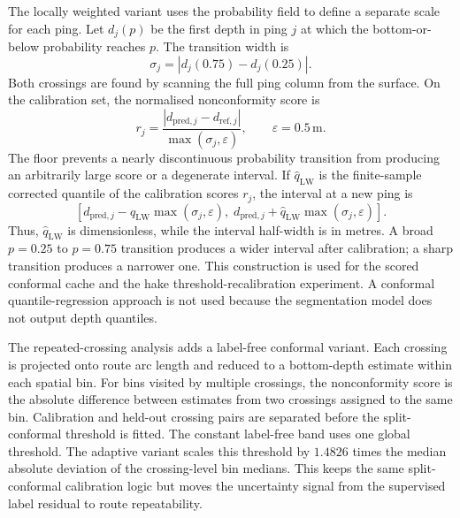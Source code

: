 The locally weighted variant uses the probability field to define a separate scale for each ping. Let $d_j(p)$ be the first depth in ping $j$ at which the bottom-or-below probability reaches $p$. The transition width is
\begin{equation}
    \sigma_j = \left|d_j(0.75)-d_j(0.25)\right|.
\end{equation}
Both crossings are found by scanning the full ping column from the surface. On the calibration set, the normalised nonconformity score is
\begin{equation}
    r_j =
    \frac{\left|d_{\text{pred},j}-d_{\text{ref},j}\right|}
         {\max(\sigma_j,\varepsilon)},
    \qquad \varepsilon=0.5\,\mathrm{m}.
\end{equation}
The floor prevents a nearly discontinuous probability transition from producing an arbitrarily large score or a degenerate interval. If $\hat q_\mathrm{LW}$ is the finite-sample corrected quantile of the calibration scores $r_j$, the interval at a new ping is
\begin{equation}
    \left[
    d_{\text{pred},j}-\hat q_\mathrm{LW}\max(\sigma_j,\varepsilon),
    \;
    d_{\text{pred},j}+\hat q_\mathrm{LW}\max(\sigma_j,\varepsilon)
    \right].
\end{equation}
Thus, $\hat q_\mathrm{LW}$ is dimensionless, while the interval half-width is in metres. A broad $p=0.25$ to $p=0.75$ transition produces a wider interval after calibration; a sharp transition produces a narrower one. This construction is used for the scored conformal cache and the hake threshold-recalibration experiment. A conformal quantile-regression approach \citep{romano_conformalized_2019} is not used because the segmentation model does not output depth quantiles.

The repeated-crossing analysis adds a label-free conformal variant. Each crossing is projected onto route arc length and reduced to a bottom-depth estimate within each spatial bin. For bins visited by multiple crossings, the nonconformity score is the absolute difference between estimates from two crossings assigned to the same bin. Calibration and held-out crossing pairs are separated before the split-conformal threshold is fitted. The constant label-free band uses one global threshold. The adaptive variant scales this threshold by $1.4826$ times the median absolute deviation of the crossing-level bin medians. This keeps the same split-conformal calibration logic but moves the uncertainty signal from the supervised label residual to route repeatability.

